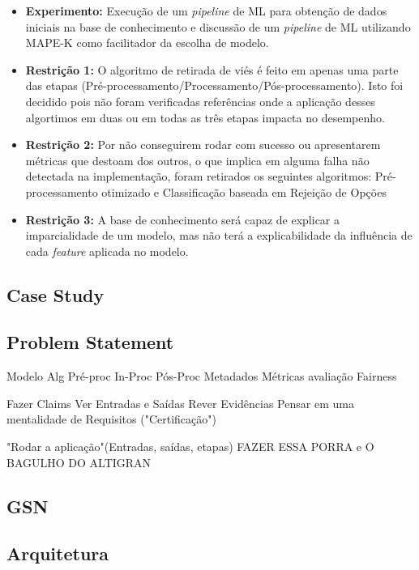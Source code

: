 \documentclass[portugues, 12pt, a4paper]{article}
\begin{document}
\begin{itemize}
\item \textbf{Experimento:} Execução de um \textit{pipeline} de ML para obtenção de dados iniciais na base de conhecimento e discussão de um \textit{pipeline} de ML utilizando MAPE-K como facilitador da escolha de modelo.

\item \textbf{Restrição 1:} O algoritmo de retirada de viés é feito em apenas uma parte das etapas (Pré-processamento/Processamento/Pós-processamento). Isto foi decidido pois não foram verificadas referências onde a aplicação desses algortimos em duas ou em todas as três etapas impacta no desempenho.

\item \textbf{Restrição 2:} Por não conseguirem rodar com sucesso ou apresentarem métricas que destoam dos outros, o que implica em alguma falha não detectada na implementação, foram retirados os seguintes algoritmos: Pré-processamento otimizado e Classificação baseada em Rejeição de Opções

\item \textbf{Restrição 3:} A base de conhecimento será capaz de explicar a imparcialidade de um modelo, mas não terá a explicabilidade da influência de cada \textit{feature} aplicada no modelo.
\end{itemize}

\subsection{Case Study}
\subsection{Problem Statement}

Modelo
\/
Alg
Pré-proc
In-Proc
Pós-Proc
\/
Metadados
Métricas avaliação
Fairness

Fazer Claims 
Ver Entradas e Saídas
Rever Evidências
Pensar em uma mentalidade de Requisitos ("Certificação")

"Rodar a aplicação"(Entradas, saídas, etapas)
FAZER ESSA PORRA e O BAGULHO DO ALTIGRAN

\subsection{GSN}

\subsection{Arquitetura}
\end{document}
